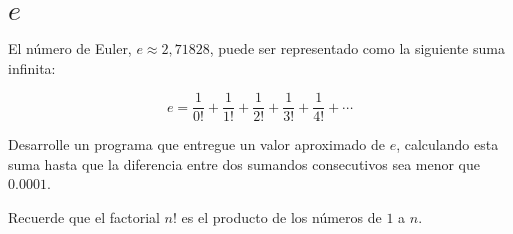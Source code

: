 \section{$e$}

El número de Euler, \(e\approx 2,71828\), puede ser representado como la
siguiente suma infinita:

\[e = \frac{1}{0!} +  \frac{1}{1!} +  \frac{1}{2!} +  \frac{1}{3!} +  \frac{1}{4!} + \cdots\]

Desarrolle un programa que entregue un valor aproximado de \(e\),
calculando esta suma hasta que la diferencia entre dos sumandos
consecutivos sea menor que \(0.0001\).

Recuerde que el factorial \(n!\) es el producto de los números de \(1\) a
\(n\).
